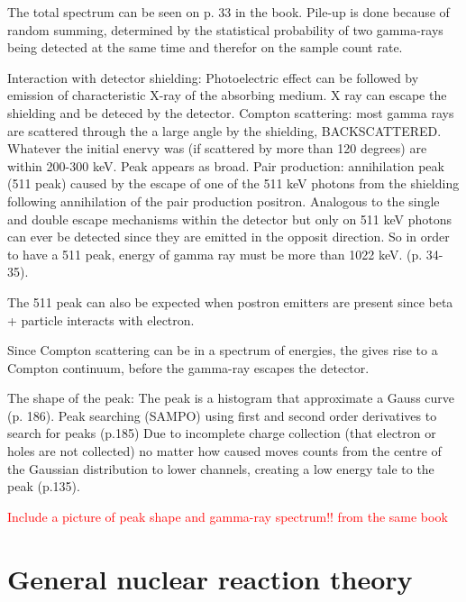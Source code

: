 \documentclass[a4paper,11pt,twoside]{book}
\begin{document}
The total spectrum can be seen on p. 33 in the book. Pile-up is done because of random summing, determined by the statistical probability of two gamma-rays being detected at the same time and therefor on the sample count rate. 

Interaction with detector shielding: Photoelectric effect can be followed by emission of characteristic X-ray of the absorbing medium. X ray can escape the shielding and be deteced by the detector. Compton scattering: most gamma rays are scattered through the a large angle by the shielding, BACKSCATTERED. Whatever the initial enervy  was (if scattered by more than 120 degrees) are within 200-300 keV. Peak appears as broad. Pair production: annihilation peak (511 peak) caused by the escape of one of the 511 keV photons from the shielding following annihilation of the pair production positron. Analogous to the single and double escape mechanisms within the detector but only on 511 keV photons can ever be detected since they are emitted in the opposit direction. So in order to have a 511 peak, energy of gamma ray must be more than 1022 keV. (p. 34-35).

The 511 peak can also be expected when postron emitters are present since beta + particle interacts with electron.  

Since Compton scattering can be in a spectrum of energies, the gives rise to a Compton continuum, before the gamma-ray escapes the detector. 


The shape of the peak: The peak is a histogram that approximate a Gauss curve (p. 186). Peak searching (SAMPO) using first and second order derivatives to search for peaks (p.185)
Due to incomplete charge collection (that electron or holes are not collected) no matter how caused moves counts from the centre of the Gaussian distribution to lower channels, creating a low energy tale to the peak (p.135).  

\textcolor{red}{Include a picture of peak shape and gamma-ray spectrum!! from the same book}


\section{General nuclear reaction theory}
\end{document}
